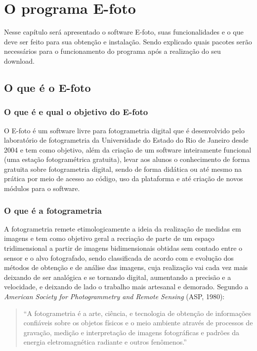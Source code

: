\chapter{O programa E-foto}

Nesse capítulo será apresentado o software E-foto, suas funcionalidades e o que deve ser feito para sua obtenção e instalação. Sendo explicado quais pacotes serão necessários para o funcionamento do programa após a realização do seu download.

\section{O que é o E-foto}
\subsection{O que é e qual o objetivo do E-foto}
O E-foto é um software livre para fotogrametria digital que é desenvolvido pelo laboratório de fotogrametria da Universidade do Estado do Rio de Janeiro desde 2004 e tem como objetivo, além da criação de um software inteiramente funcional (uma estação fotogramétrica gratuita), levar aos alunos o conhecimento de forma gratuita sobre fotogrametria digital, sendo de forma didática ou até mesmo na prática por meio de acesso ao código, uso da plataforma e até criação de novos módulos para o software.

\subsection{O que é a fotogrametria}
A fotogrametria remete etimologicamente a ideia da realização de medidas em imagens e tem como objetivo geral a recriação de parte de um espaço tridimensional a partir de imagens bidimensionais obtidas sem contado entre o sensor e o alvo fotografado, sendo classificada de acordo com e evolução dos métodos de obtenção e de análise das imagens, cuja realização vai cada vez mais deixando de ser analógica e se tornando digital, aumentando a precisão e a velocidade, e deixando de lado o trabalho mais artesanal e demorado.
Segundo a \textit{American Society for Photogrammetry and Remote Sensing} (ASP, 1980):

\begin{quote}
	``A fotogrametria é a arte, ciência, e tecnologia de obtenção de informações confiáveis sobre os objetos físicos e o meio ambiente através de processos de gravação, medição e interpretação de imagens fotográficas e padrões da energia eletromagnética radiante e outros fenômenos.''
\end{quote}

